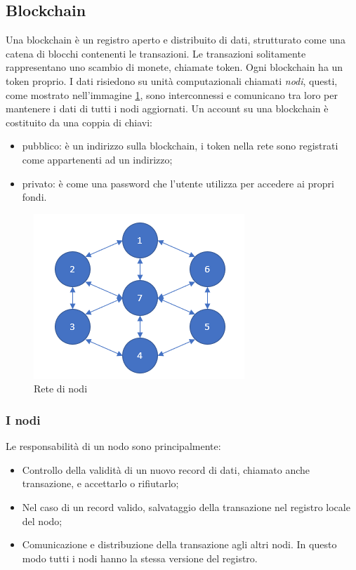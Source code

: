 \documentclass[a4paper]{article}
\begin{document}
    \subsection{Blockchain}
    Una blockchain è un registro aperto e distribuito di dati, strutturato come una catena di blocchi contenenti le transazioni.
    Le transazioni solitamente rappresentano uno scambio di monete, chiamate token. Ogni blockchain ha un token proprio.
    I dati risiedono su unità computazionali chiamati \emph{nodi}, questi, come mostrato nell'immagine \ref{fig:node},
    sono interconnessi e comunicano tra loro per mantenere i dati di tutti i nodi aggiornati\cite{nodo}.
    Un account su una blockchain è costituito da una coppia di chiavi:
    \begin{itemize}
      \item pubblico: è un indirizzo sulla blockchain, i token nella rete sono registrati come appartenenti ad un indirizzo;
      \item privato: è come una password che l'utente utilizza per accedere ai propri fondi.
    \end{itemize}
    \begin{figure}[ht]
      \includegraphics[scale=0.8, fbox]{node.png}
      \centering
      \caption{Rete di nodi}
      \centering
      \label{fig:node}
    \end{figure}
    \subsubsection{I nodi}
    Le responsabilità di un nodo sono principalmente:
    \begin{itemize}
      \item Controllo della validità di un nuovo record di dati, chiamato anche transazione, e accettarlo o rifiutarlo;
      \item Nel caso di un record valido, salvataggio della transazione nel registro locale del nodo;
      \item Comunicazione e distribuzione della transazione agli altri nodi. In questo modo tutti i nodi hanno la stessa versione del registro.
    \end{itemize}
\end{document}
